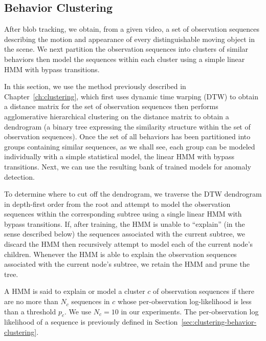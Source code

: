 \subsection{Behavior Clustering}
\label{sec:batch-behavior-clustering}

After blob tracking, we obtain, from a given video, a set of
observation sequences describing the motion and appearance of every
distinguishable moving object in the scene.  We next partition the
observation sequences into clusters of similar behaviors then model
the sequences within each cluster using a simple linear HMM with 
bypass transitions. 

In this section, we use the method previously described in
Chapter~\ref{ch:clustering}, which first uses dynamic time warping
(DTW) to obtain a distance matrix for the set of observation sequences
then performs agglomerative hierarchical clustering on the distance
matrix to obtain a dendrogram (a binary tree expressing the similarity
structure within the set of observation sequences).  
Once the set of all behaviors has been partitioned into
groups containing similar sequences, as we shall see, each group can
be modeled individually with a simple statistical model, the linear
HMM with bypass transitions. Next, we can use the resulting bank of 
trained models for anomaly detection.



To determine 
where to cut off the dendrogram, we traverse the DTW dendrogram in
depth-first order from the root and attempt to model the observation
sequences within the corresponding subtree using a single linear HMM 
with bypass transitions. If, after training, the HMM is unable to 
``explain'' (in the sense described below) the sequences associated 
with the current subtree, we
discard the HMM then recursively attempt to model each of the current
node's children. Whenever the HMM is able to explain the observation
sequences associated with the current node's subtree, we retain the
HMM and prune the tree.

A HMM is said to explain or model a cluster $c$ of observation
sequences if there are no more than $N_c$ sequences in $c$ whose
per-observation log-likelihood is less than a threshold $p_c$.  We use
$N_c=10$ in our experiments. The per-observation log likelihood of a
sequence is previously defined in
Section~\ref{sec:clustering-behavior-clustering}.

